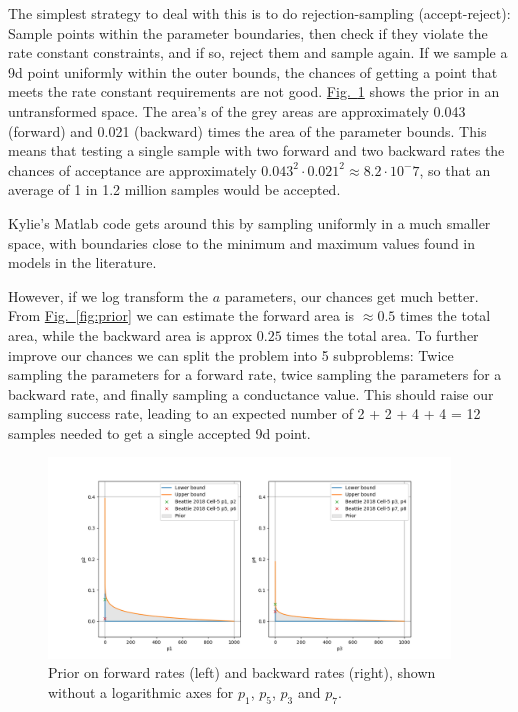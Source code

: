 \documentclass[preprint,authoryear,10pt]{elsarticle}
\newcommand\fig[2][]{\hyperref[fig:#2]{Fig.~\ref*{fig:#2}\ifstrempty{#1}{}{.#1}}}
\newcommand\Fig[2][]{\hyperref[fig:#2]{Fig.~\ref*{fig:#2}\ifstrempty{#1}{}{.#1}}}
\begin{document}
The simplest strategy to deal with this is to do rejection-sampling
 (accept-reject): Sample points within the parameter boundaries, then check if
 they violate the rate constant constraints, and if so, reject them and sample
 again.
If we sample a 9d point uniformly within the outer bounds, the chances of
 getting a point that meets the rate constant requirements are not good.
\Fig{prior-no-log} shows the prior in an untransformed space.
The area's of the grey areas are approximately 0.043 (forward) and 0.021
 (backward) times the area of the parameter bounds.
This means that testing a single sample with two forward and two backward
 rates the chances of acceptance are approximately
 $0.043^2 \cdot 0.021^2 \approx 8.2 \cdot 10^-7$, so that an average of 1 in
 1.2 million samples would be accepted.

Kylie's Matlab code gets around this by sampling uniformly in a much smaller
 space, with boundaries close to the minimum and maximum values found in models
 in the literature.

However, if we log transform the $a$ parameters, our chances get much better.
From \fig{prior} we can estimate the forward area is $\approx 0.5$ times the
 total area, while the backward area is approx $0.25$ times the total area.
To further improve our chances we can split the problem into 5 subproblems:
 Twice sampling the parameters for a forward rate, twice sampling the
 parameters for a backward rate, and finally sampling a conductance value.
This should raise our sampling success rate, leading to an expected number of
 2 + 2 + 4 + 4 = 12 samples needed to get a single accepted 9d point.

\begin{figure}[H]
\centerline{
\includegraphics[width=0.95\textwidth]{fig/prior-no-log}
}
\caption{%
Prior on forward rates (left) and backward rates (right), shown without a
logarithmic axes for $p_1$, $p_5$, $p_3$ and $p_7$.
}
\label{fig:prior-no-log}
\end{figure}
\end{document}
